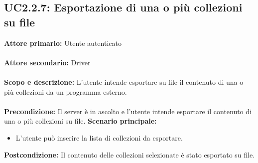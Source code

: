 \documentclass{scalatekids-article}
\begin{document}
\subsection{UC2.2.7: Esportazione di una o più collezioni su file}

\textbf{Attore primario:} Utente autenticato\\ \\
\textbf{Attore secondario:} Driver\\ \\
\textbf{Scopo e descrizione:} L'utente intende esportare su file il contenuto di una o più collezioni da un programma  esterno.\\ \\
\textbf{Precondizione:} Il server è in ascolto e l'utente intende esportare il contenuto di una o più collezioni su file.
\textbf{Scenario principale:}
\begin{itemize}
  \item L'utente può inserire la lista di collezioni da esportare. %
\end{itemize}
\textbf{Postcondizione:} Il contenuto delle collezioni selezionate è stato esportato su file.
\end{document}
